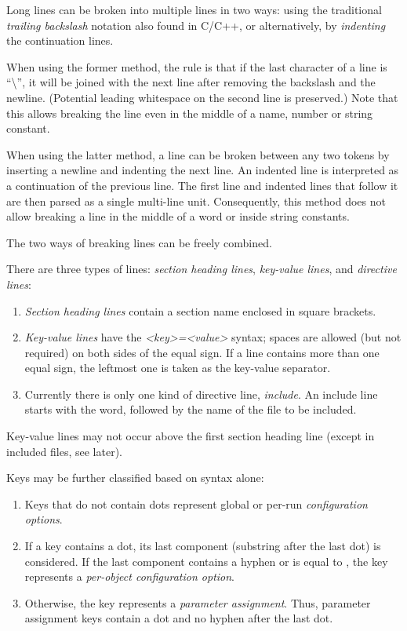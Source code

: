 Long lines can be broken into multiple lines in two ways: using the traditional
\textit{trailing backslash} notation also found in C/C++, or alternatively, by
\textit{indenting} the continuation lines.

When using the former method, the rule is that if the last character of a line
is ``\textbackslash'', it will be joined with the next line after removing the
backslash and the newline. (Potential leading whitespace on the second line is
preserved.) Note that this allows breaking the line even in the middle of a
name, number or string constant.

When using the latter method, a line can be broken between any two tokens by inserting
a newline and indenting the next line. An indented line is interpreted as a
continuation of the previous line. The first line and indented lines that follow
it are then parsed as a single multi-line unit. Consequently, this method does
not allow breaking a line in the middle of a word or inside string constants.

The two ways of breaking lines can be freely combined.

There are three types of lines: \textit{section heading lines},
\textit{key-value lines}, and \textit{directive lines}:

\begin{enumerate}
\item \textit{Section heading lines} contain a section name enclosed in square brackets.
\item \textit{Key-value lines} have the \textit{<key>=<value>} syntax; spaces
 are allowed (but not required) on both sides of the equal sign.
 If a line contains more than one equal sign, the leftmost one is taken
 as the key-value separator.
\item Currently there is only one kind of directive line, \textit{include}. An
 include line starts with the  word, followed by the name of
 the file to be included.
\end{enumerate}

Key-value lines may not occur above the first section heading line (except
in included files, see later).

Keys may be further classified based on syntax alone:

\begin{enumerate}
\item Keys that do not contain dots represent global or per-run \textit{configuration options}.
\item If a key contains a dot, its last component (substring after the last dot)
    is considered. If the last component contains a hyphen or is equal to
    , the key represents a \textit{per-object configuration option}.
\item Otherwise, the key represents a \textit{parameter assignment}. Thus, parameter
    assignment keys contain a dot and no hyphen after the last dot.
\end{enumerate}

